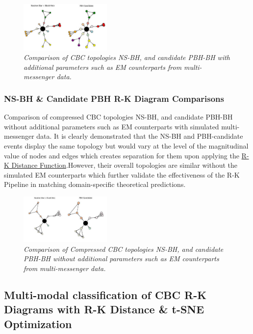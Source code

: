 \begin{figure}[H]
 	\centering
        \includegraphics[width=0.4\textwidth]{images/Multiparameter comparison_NSBH_PBH.jpg}
	\caption{\textit{Comparison of CBC topologies NS-BH, and candidate PBH-BH with additional parameters such as EM counterparts from multi-messenger data.}}
	\label{fig:Multi-NSBH-PBH}
\end{figure}

\subsubsection{NS-BH \& Candidate PBH R-K Diagram Comparisons}

Comparison of compressed CBC topologies NS-BH, and candidate PBH-BH without additional parameters such as EM counterparts with simulated multi-messenger data. It is clearly demonstrated that the NS-BH and PBH-candidate events display the same topology but would vary at the level of the magnitudinal value of nodes and edges which creates separation for them upon applying the \hyperref[sec:rk_distance]{ R-K Distance Function}.However, their overall topologies are similar without the simulated EM counterparts which further validate the effectiveness of the R-K Pipeline in matching domain-specific theoretical predictions.

\begin{figure}[H]
 	\centering
        \includegraphics[width=0.4\textwidth]{images/Compressed_Parameter_Comparison_NSBH_PBH.jpg}
	\caption{\textit{Comparison of Compressed CBC topologies NS-BH, and candidate PBH-BH without additional parameters such as EM counterparts from multi-messenger data.
}}
	\label{fig:Compressed_NSBH-PBH}
\end{figure}



 \subsection{Multi-modal classification of CBC R-K Diagrams with R-K Distance \& t-SNE Optimization}

